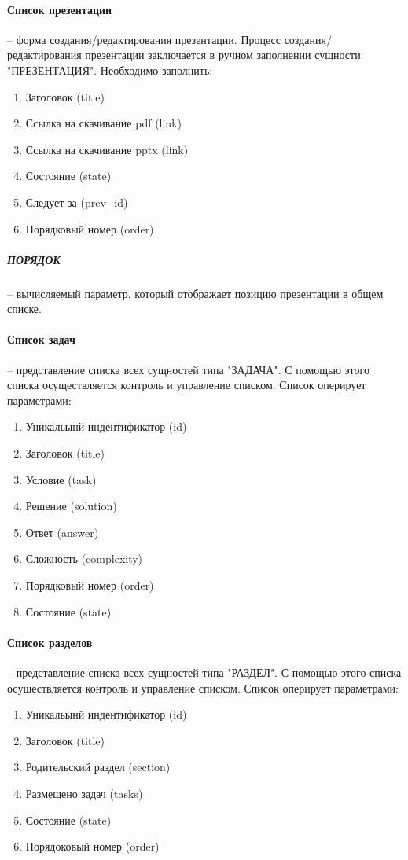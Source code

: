 \paragraph{Список презентации} -- форма создания/редактирования презентации.
Процесс создания/редактирования презентации заключается в ручном заполнении сущности "ПРЕЗЕНТАЦИЯ".
Необходимо заполнить:
\begin{enumerate}
  \item Заголовок (title)
  \item Ссылка на скачивание pdf (link)
  \item Ссылка на скачивание pptx (link)
  \item Состояние (state)
  \item Следует за (prev\_id)
  \item Порядковый номер (order)
\end{enumerate}
\subparagraph{ПОРЯДОК} -- вычисляемый параметр, который отображает позицию презентации в общем списке.

\paragraph{Список задач} -- представление списка всех сущностей типа "ЗАДАЧА". С помощью этого списка осуществляется контроль и управление списком.
Список оперирует параметрами:
\begin{enumerate}
  \item Уникальынй индентификатор (id)
  \item Заголовок (title)
  \item Условие (task)
  \item Решение (solution)
  \item Ответ (answer)
  \item Сложность (complexity)
  \item Порядковый номер (order)
  \item Состояние (state)
\end{enumerate}

\paragraph{Список разделов} -- представление списка всех сущностей типа "РАЗДЕЛ". С помощью этого списка осуществляется контроль и управление списком.
Список оперирует параметрами:
\begin{enumerate}
  \item Уникальынй индентификатор (id)
  \item Заголовок (title)
  \item Родительский раздел (section)
  \item Размещено задач (tasks)
  \item Состояние (state)
  \item Порядоковый номер (order)
\end{enumerate}
